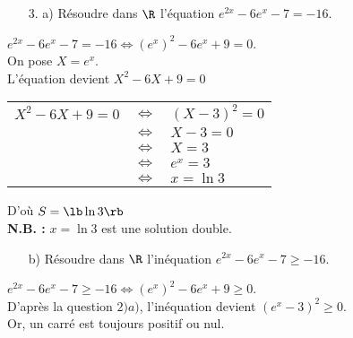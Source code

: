 \vspace*{.3cm}

\begin{itemize}
\item[3. a)] Résoudre dans $\R$ l'équation $e^{2x} - 6e^x - 7 = -16$. \\ 
\end{itemize}

\vspace*{.3cm}

$e^{2x} - 6e^x - 7 = -16 \Longleftrightarrow \left(e^x\right)^2 - 6e^x + 9 = 0$. \\

On pose $X = e^x$. \\

L'équation devient $X^2 - 6X + 9 = 0$ \\

\begin{tabular}{lll}
$X^2 - 6X + 9 = 0$ & $\Longleftrightarrow$ & $\left(X-3\right)^2 = 0$ \\
& $\Longleftrightarrow$ & $X -3 = 0$ \\
& $\Longleftrightarrow$ & $X = 3$ \\
& $\Longleftrightarrow$ & $e^x = 3$ \\
& $\Longleftrightarrow$ & $x = \ln 3$ \\
\end{tabular}

\vspace*{.3cm}

D'où $S = \lb \ln 3 \rb $ \\

\textbf{N.B. :} $x = \ln 3$ est une solution double. \\

\begin{itemize}
\item[b)] Résoudre dans $\R$ l'inéquation $e^{2x} - 6e^x - 7 \geqslant -16$. \\ 
\end{itemize}

\vspace*{.3cm}

$e^{2x} - 6e^x - 7 \geqslant -16 \Longleftrightarrow \left(e^x\right)^2 - 6e^x + 9 \geqslant 0$. \\

D'après la question $2)a)$, l'inéquation devient $\left(e^x - 3\right)^2 \geqslant 0$. \\

Or, un carré est toujours positif ou nul. \\

